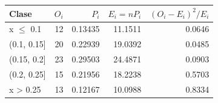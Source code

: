 \begin{tabular}{lrrrr}
\toprule
\textbf{Clase} & \textbf{$O_i$} & \textbf{$P_i$} & \textbf{$E_i=nP_i$} & \textbf{$(O_i-E_i)^2/E_i$} \\ \midrule
x $\le$ 0.1 & 12 & 0.13435 & 11.1511 & 0.0646 \\
(0.1, 0.15] & 20 & 0.22939 & 19.0392 & 0.0485 \\
(0.15, 0.2] & 23 & 0.29503 & 24.4871 & 0.0903 \\
(0.2, 0.25] & 15 & 0.21956 & 18.2238 & 0.5703 \\
x > 0.25 & 13 & 0.12167 & 10.0988 & 0.8334 \\
\bottomrule
\end{tabular}